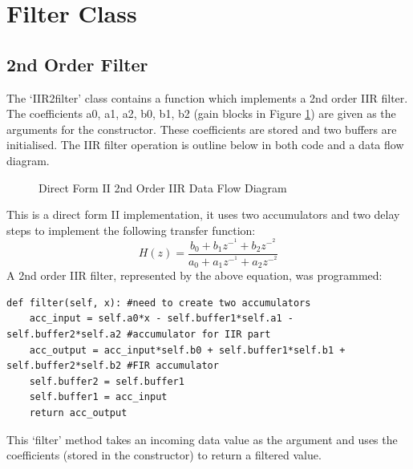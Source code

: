 \documentclass{article}
\begin{document}
\section{Filter Class}
\subsection{2nd Order Filter}
The `IIR2filter' class contains a function which implements a 2nd order IIR filter. The coefficients a0, a1, a2, b0, b1, b2 (gain blocks in Figure \ref{fig:dataFlow}) are given as the arguments for the constructor. These coefficients are stored and two buffers are initialised. The IIR filter operation is outline below in both code and a data flow diagram.
\begin{figure}[H]
    \centering
    
    \caption{Direct Form II 2nd Order IIR Data Flow Diagram}
    \label{fig:dataFlow}
\end{figure}
This is a direct form II implementation, it uses two accumulators and two delay steps to implement the following transfer function:
\[H(z) = \frac{b_0+b_1z^-^1+b_2z^-^2}{a_0+a_1z^-^1+a_2z^-^2}\]
A 2nd order IIR filter, represented by the above equation, was programmed:
\begin{lstlisting}
def filter(self, x): #need to create two accumulators
    acc_input = self.a0*x - self.buffer1*self.a1 - self.buffer2*self.a2 #accumulator for IIR part
    acc_output = acc_input*self.b0 + self.buffer1*self.b1 + self.buffer2*self.b2 #FIR accumulator
    self.buffer2 = self.buffer1
    self.buffer1 = acc_input
    return acc_output
\end{lstlisting}
This `filter' method takes an incoming data value as the argument and uses the coefficients (stored in the constructor) to return a filtered value.
\end{document}
